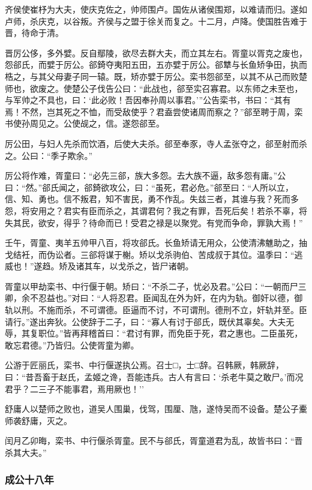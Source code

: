 \documentclass[]{article}
\begin{document}
齐侯使崔杼为大夫，使庆克佐之，帅师围卢。国佐从诸侯围郑，以难请而归。遂如卢师，杀庆克，以谷叛。齐侯与之盟于徐关而复之。十二月，卢降。使国胜告难于晋，待命于清。

晋厉公侈，多外嬖。反自鄢陵，欲尽去群大夫，而立其左右。胥童以胥克之废也，怨郤氏，而嬖于厉公。郤錡夺夷阳五田，五亦嬖于厉公。郤犨与长鱼矫争田，执而梏之，与其父母妻子同一辕。既，矫亦嬖于厉公。栾书怨郤至，以其不从己而败楚师也，欲废之。使楚公子伐告公曰：``此战也，郤至实召寡君。以东师之未至也，与军帅之不具也，曰：`此必败！吾因奉孙周以事君。'''公告栾书，书曰：``其有焉！不然，岂其死之不恤，而受敌使乎？君盍尝使诸周而察之？''郤至聘于周，栾书使孙周见之。公使觇之，信。遂怨郤至。

厉公田，与妇人先杀而饮酒，后使大夫杀。郤至奉豕，寺人孟张夺之，郤至射而杀之。公曰：``季子欺余。''

厉公将作难，胥童曰：``必先三郤，族大多怨。去大族不逼，敌多怨有庸。''公曰：``然。''郤氏闻之，郤錡欲攻公，曰：``虽死，君必危。''郤至曰：``人所以立，信、知、勇也。信不叛君，知不害民，勇不作乱。失兹三者，其谁与我？死而多怨，将安用之？君实有臣而杀之，其谓君何？我之有罪，吾死后矣！若杀不辜，将失其民，欲安，得乎？待命而已！受君之禄是以聚党。有党而争命，罪孰大焉！''

壬午，胥童、夷羊五帅甲八百，将攻郤氏。长鱼矫请无用众，公使清沸魋助之，抽戈结衽，而伪讼者。三郤将谋于榭。矫以戈杀驹伯、苦成叔于其位。温季曰：``逃威也！''遂趋。矫及诸其车，以戈杀之，皆尸诸朝。

胥童以甲劫栾书、中行偃于朝。矫曰：``不杀二子，忧必及君。''公曰：``一朝而尸三卿，余不忍益也。''对曰：``人将忍君。臣闻乱在外为奸，在内为轨。御奸以德，御轨以刑。不施而杀，不可谓德。臣逼而不讨，不可谓刑。德刑不立，奸轨并至。臣请行。''遂出奔狄。公使辞于二子，曰：``寡人有讨于郤氏，既伏其辜矣。大夫无辱，其复职位。''皆再拜稽首曰：``君讨有罪，而免臣于死，君之惠也。二臣虽死，敢忘君德。''乃皆归。公使胥童为卿。

公游于匠丽氏，栾书、中行偃遂执公焉。召士□，士□辞。召韩厥，韩厥辞，曰：``昔吾畜于赵氏，孟姬之谗，吾能违兵。古人有言曰：`杀老牛莫之敢尸。'而况君乎？二三子不能事君，焉用厥也！''

舒庸人以楚师之败也，道吴人围巢，伐驾，围厘、虺，遂恃吴而不设备。楚公子櫜师袭舒庸，灭之。

闰月乙卯晦，栾书、中行偃杀胥童。民不与郤氏，胥童道君为乱，故皆书曰：``晋杀其大夫。''

\hypertarget{header-n1785}{%
\subsubsection{成公十八年}\label{header-n1785}}
\end{document}
